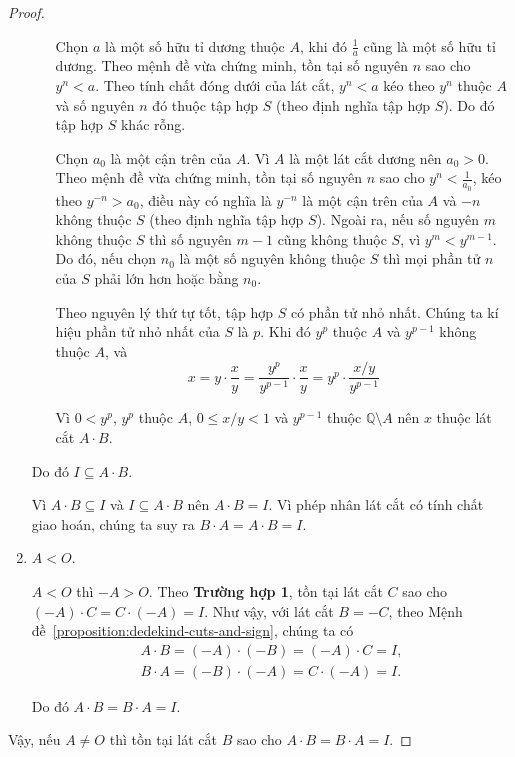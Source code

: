 \begin{proof}
\begin{enumerate}[label={\textbf{Trường hợp \arabic*.}},itemindent=2cm]
\begin{enumerate}[label={\textbf{Khả năng \arabic*.}},itemindent=1.5cm]
                        Chọn $a$ là một số hữu tỉ dương thuộc $A$, khi đó $\frac{1}{a}$ cũng là một số hữu tỉ dương. Theo mệnh đề vừa chứng minh, tồn tại số nguyên $n$ sao cho $y^{n} < a$. Theo tính chất đóng dưới của lát cắt, $y^{n} < a$ kéo theo $y^{n}$ thuộc $A$ và số nguyên $n$ đó thuộc tập hợp $S$ (theo định nghĩa tập hợp $S$). Do đó tập hợp $S$ khác rỗng.

                        Chọn $a_{0}$ là một cận trên của $A$. Vì $A$ là một lát cắt dương nên $a_{0} > 0$. Theo mệnh đề vừa chứng minh, tồn tại số nguyên $n$ sao cho $y^{n} < \frac{1}{a_{0}}$, kéo theo $y^{-n} > a_{0}$, điều này có nghĩa là $y^{-n}$ là một cận trên của $A$ và $-n$ không thuộc $S$ (theo định nghĩa tập hợp $S$). Ngoài ra, nếu số nguyên $m$ không thuộc $S$ thì số nguyên $m-1$ cũng không thuộc $S$, vì $y^{m} < y^{m-1}$. Do đó, nếu chọn $n_{0}$ là một số nguyên không thuộc $S$ thì mọi phần tử $n$ của $S$ phải lớn hơn hoặc bằng $n_{0}$.

                        Theo nguyên lý thứ tự tốt, tập hợp $S$ có phần tử nhỏ nhất. Chúng ta kí hiệu phần tử nhỏ nhất của $S$ là $p$. Khi đó $y^{p}$ thuộc $A$ và $y^{p-1}$ không thuộc $A$, và
                        \[
                            x = y\cdot\frac{x}{y} = \frac{y^{p}}{y^{p-1}}\cdot\frac{x}{y} = y^{p}\cdot \frac{x/y}{y^{p-1}}
                        \]

                        Vì $0 < y^{p}$, $y^{p}$ thuộc $A$, $0\leq x/y < 1$ và $y^{p-1}$ thuộc $\mathbb{Q}\setminus A$ nên $x$ thuộc lát cắt $A\cdot B$.
              \end{enumerate}

              Do đó $I\subseteq A\cdot B$.

              Vì $A\cdot B\subseteq I$ và $I\subseteq A\cdot B$ nên $A\cdot B = I$. Vì phép nhân lát cắt có tính chất giao hoán, chúng ta suy ra $B\cdot A = A\cdot B = I$.
        \item $A < O$.

              $A < O$ thì $-A > O$. Theo \textbf{Trường hợp 1}, tồn tại lát cắt $C$ sao cho $(-A)\cdot C = C\cdot (-A) = I$. Như vậy, với lát cắt $B = -C$, theo Mệnh đề~\ref{proposition:dedekind-cuts-and-sign}, chúng ta có
              \[
                  \begin{split}
                      A\cdot B = (-A)\cdot (-B) = (-A)\cdot C = I, \\
                      B\cdot A = (-B)\cdot (-A) = C\cdot (-A) = I.
                  \end{split}
              \]

              Do đó $A\cdot B = B\cdot A = I$.
    \end{enumerate}

    Vậy, nếu $A \ne O$ thì tồn tại lát cắt $B$ sao cho $A\cdot B = B\cdot A = I$.
\end{proof}

